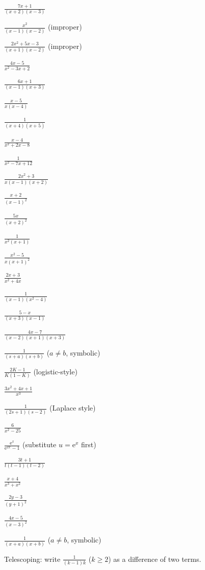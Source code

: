 \begin{problems}
  \item $\displaystyle\frac{7x+1}{(x+2)(x-3)}$
  \item $\displaystyle\frac{x^{2}}{(x-1)(x-2)}$ (improper)
  \item $\displaystyle\frac{2x^{2}+5x-3}{(x+1)(x-2)}$ (improper)
  \item $\displaystyle\frac{4x-5}{x^{2}-3x+2}$
  \item $\displaystyle\frac{6x+1}{(x-1)(x+3)}$
  \item $\displaystyle\frac{x-5}{x(x-4)}$
  \item $\displaystyle\frac{1}{(x+4)(x+5)}$
  \item $\displaystyle\frac{x-4}{x^{2}+2x-8}$
  \item $\displaystyle\frac{1}{x^{2}-7x+12}$
  \item $\displaystyle\frac{2x^{2}+3}{x(x-1)(x+2)}$
  \item $\displaystyle\frac{x+2}{(x-1)^{2}}$
  \item $\displaystyle\frac{5x}{(x+2)^{2}}$
  \item $\displaystyle\frac{1}{x^{2}(x+1)}$
  \item $\displaystyle\frac{x^{2}-5}{x(x+1)^{2}}$
  \item $\displaystyle\frac{2x+3}{x^{2}+4x}$
  \item $\displaystyle\frac{1}{(x-1)(x^{2}-4)}$
  \item $\displaystyle\frac{5-x}{(x+3)(x-1)}$
  \item $\displaystyle\frac{4x-7}{(x-2)(x+1)(x+3)}$
  \item $\displaystyle\frac{1}{(s+a)(s+b)}$ ($a\neq b$, symbolic)
  \item $\displaystyle\frac{2K-1}{K(1-K)}$ (logistic-style)
  \item $\displaystyle\frac{3x^{2}+4x+1}{x^{3}}$
  \item $\displaystyle\frac{1}{(2s+1)(s-2)}$ (Laplace style)
  \item $\displaystyle\frac{6}{x^{2}-25}$
  \item $\displaystyle\frac{\mathrm{e}^{x}}{\mathrm{e}^{2x}-1}$
        (substitute $u=\mathrm{e}^{x}$ first)
  \item $\displaystyle\frac{3t+1}{t(t-1)(t-2)}$
  \item $\displaystyle\frac{x+4}{x^{3}+x^{2}}$
  \item $\displaystyle\frac{2y-3}{(y+1)^{2}}$
  \item $\displaystyle\frac{4x-5}{(x-3)^{2}}$
  \item $\displaystyle\frac{1}{(x+a)(x+b)}$ ($a\neq b$, symbolic)
  \item Telescoping: write $\displaystyle\frac{1}{(k-1)k}$ ($k\ge 2$) as a
        difference of two terms.
\end{problems}

